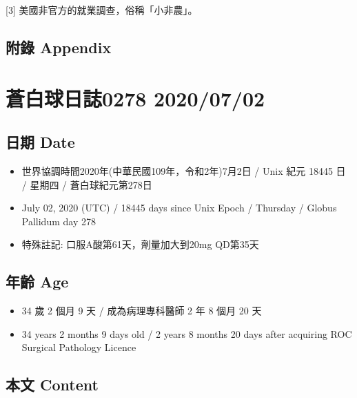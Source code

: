 \documentclass[a5paper, 11pt
]{book}
\providecommand{\tightlist}{%
  \setlength{\itemsep}{0pt}\setlength{\parskip}{0pt}}
\begin{document}
{[}3{]} 美國非官方的就業調查，俗稱「小非農」。

\hypertarget{ux9644ux9304-appendix-30}{%
\subsection{附錄 Appendix}\label{ux9644ux9304-appendix-30}}

\hypertarget{ux84bcux767dux7403ux65e5ux8a8c0278-20200702}{%
\section{蒼白球日誌0278
2020/07/02}\label{ux84bcux767dux7403ux65e5ux8a8c0278-20200702}}

\hypertarget{ux65e5ux671f-date-31}{%
\subsection{日期 Date}\label{ux65e5ux671f-date-31}}

\begin{itemize}
\tightlist
\item
  世界協調時間2020年(中華民國109年，令和2年)7月2日 / Unix 紀元 18445 日
  / 星期四 / 蒼白球紀元第278日
\item
  July 02, 2020 (UTC) / 18445 days since Unix Epoch / Thursday / Globus
  Pallidum day 278
\item
  特殊註記: 口服A酸第61天，劑量加大到20mg QD第35天
\end{itemize}

\hypertarget{ux5e74ux9f61-age-31}{%
\subsection{年齡 Age}\label{ux5e74ux9f61-age-31}}

\begin{itemize}
\tightlist
\item
  34 歲 2 個月 9 天 / 成為病理專科醫師 2 年 8 個月 20 天
\item
  34 years 2 months 9 days old / 2 years 8 months 20 days after
  acquiring ROC Surgical Pathology Licence
\end{itemize}

\hypertarget{ux672cux6587-content-31}{%
\subsection{本文 Content}\label{ux672cux6587-content-31}}
\end{document}
